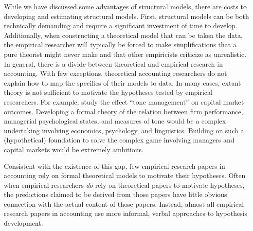 While we have discussed some advantages of structural models, there are costs to developing and estimating structural models. 
First, structural models can be both technically demanding and require a significant investment of time to develop. 
Additionally, when constructing a theoretical model that can be taken the data, the empirical researcher will typically be forced to make simplifications that a pure theorist might never make and that other empiricists criticize as unrealistic.
In general, there is a divide between theoretical and empirical research in accounting.
With few exceptions, theoretical accounting researchers do not explain how to map the specifics of their models to data. 
In many cases, extant theory is not sufficient to motivate the hypotheses tested by empirical researchers.
For example, \citet{Huang:2014cs} study the effect ``tone management'' on capital market outcomes. 
Developing a formal theory of the relation between firm performance, managerial psychological states, and measures of tone would be a complex undertaking involving economics, psychology, and linguistics.
Building on such a (hypothetical) foundation to solve the complex game involving managers and capital markets would be extremely ambitious.

Consistent with the existence of this gap, few empirical research papers in accounting rely on formal theoretical models to motivate their hypotheses. 
Often when empirical researchers \emph{do} rely on theoretical papers to motivate hypotheses, the predictions claimed to be derived from those papers have little obvious connection with the actual content of those papers.
Instead, almost all empirical research papers in accounting use more informal, verbal approaches to hypothesis development.


